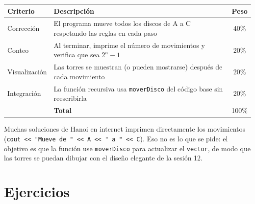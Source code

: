 \documentclass[12pt, oneside]{article}
\begin{document}
\begin{center}
\begin{tabular}{lp{7cm}c}
  \toprule
  \textbf{Criterio} & \textbf{Descripción} & \textbf{Peso} \\
  \midrule
  Corrección      & El programa mueve todos los discos de A a C
                    respetando las reglas en cada paso & 40\% \\
  Conteo          & Al terminar, imprime el número de movimientos
                    y verifica que sea $2^n - 1$ & 20\% \\
  Visualización   & Las torres se muestran (o pueden mostrarse)
                    después de cada movimiento & 20\% \\
  Integración     & La función recursiva usa \texttt{moverDisco}
                    del código base sin reescribirla & 20\% \\
  \bottomrule
  & \textbf{Total} & 100\% \\
  \bottomrule
\end{tabular}
\end{center}

\begin{advertencia}
  Muchas soluciones de Hanoi en internet imprimen directamente los movimientos
  (\texttt{cout << "Mueve de " << A << " a " << C}).
  Eso no es lo que se pide: el objetivo es que la función use
  \texttt{moverDisco} para actualizar el \texttt{vector}, de modo que las
  torres se puedan dibujar con el diseño elegante de la sesión 12.
\end{advertencia}

\section{Ejercicios}
\end{document}
